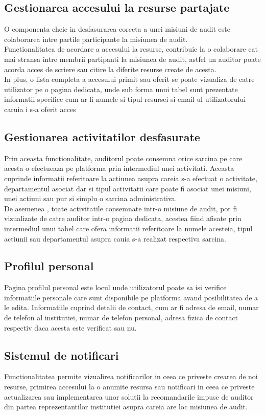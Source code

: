 	\subsection{Gestionarea accesului la resurse partajate}
	 O componenta cheie in desfasurarea corecta a unei misiuni de audit este colaborarea intre partile participante la misiunea de audit.\\
		Functionalitatea de acordare a accesului la resurse, contribuie la o colaborare cat mai stransa intre membrii partipanti la misiunea de audit, astfel un auditor poate acorda acces de scriere sau citire la diferite resurse create de acesta.\\
		In plus, o lista completa a accesului primit sau oferit se poate vizualiza de catre utilizator pe o pagina dedicata, unde sub forma unui tabel sunt prezentate informatii specifice cum ar fi numele si tipul resursei si email-ul utilizatorului caruia i s-a oferit  acces
		
	\subsection{Gestionarea activitatilor desfasurate}
	 Prin aceasta functionalitate, auditorul poate consemna orice sarcina pe care acesta o efectueaza pe platforma prin intermediul unei activitati. Aceasta cuprinde informatii referitoare la actiunea asupra careia s-a efectuat o activitate, departamentul asociat dar si tipul activitatii care poate fi asociat unei misiuni, unei actiuni sau pur si simplu o sarcina administrativa.\\
	 De asemenea , toate activitatile consemnate intr-o misiune de audit, pot fi vizualizate de catre auditor intr-o pagina dedicata, acestea fiind afisate prin intermediul unui tabel care ofera informatii referitoare la numele acesteia, tipul actiunii sau departamentul asupra cauia s-a realizat respectiva sarcina.
	 
	
	\subsection{Profilul personal}
	Pagina profilul personal este locul unde utilizatorul poate sa isi verifice informatiile personale care sunt disponibile pe platforma avand posibilitatea de a le edita. Informatiile cuprind detalii de contact, cum ar fi adresa de email, numar de telefon al institutiei, numar de telefon personal, adresa fizica de contact respectiv daca acesta este verificat sau nu.
 
	
	\subsection{Sistemul de notificari}
		Functionalitatea permite vizualirea notificarilor in ceea ce priveste crearea de noi resurse, primirea accesului la o anumite resursa sau notificari in ceea ce priveste actualizarea sau implementarea unor solutii la recomandarile impuse de auditor din partea reprezentantilor institutiei asupra careia are loc misiunea de audit.





